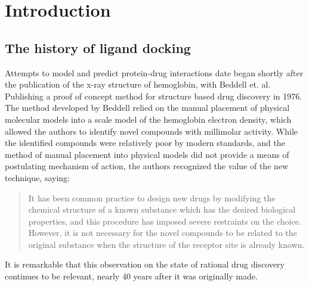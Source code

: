 \chapter{Introduction}

\section{The history of ligand docking}
Attempts to model and predict protein-drug interactions date began shortly after the publication of the x-ray structure of hemoglobin, with Beddell et. al. Publishing a proof of concept method for structure based drug discovery in 1976\citep{BEDDELL:1976go}.
The method developed by Beddell relied on the manual placement of physical molecular models into a scale model of the hemoglobin electron density, which allowed the authors to identify novel compounds with millimolar activity. 
While the identified compounds were relatively poor by modern standards, and the method of manual placement into physical models did not provide a means of postulating mechanism of action, the authors recognized the value of the new technique, saying:
\begin{quote}
It has been common practice to design new drugs by modifying the chemical structure of a known substance which has the desired biological properties, and this procedure has imposed severe restraints on the choice.
However, it is not necessary for the novel compounds to be related to the original substance when the structure of the receptor site is already known. 
\end{quote}
It is remarkable that this observation on the state of rational drug discovery continues to be relevant, nearly 40 years after it was originally made. 

